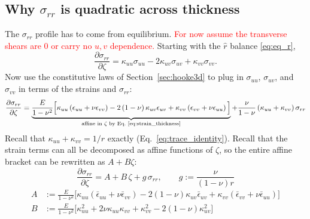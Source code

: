 \documentclass[11pt]{article}
\begin{document}
\subsection{Why \texorpdfstring{$\sigma_{rr}$}{sigma-rr} is quadratic across thickness}
\label{sec:srr_quadratic}
The $\sigma_{rr}$ profile has to come from equilibrium. 
\textcolor{red}{For now assume the transverse shears are 0 or carry no $u,v$ dependence.} Starting with the $\hat r$ balance \eqref{eq:eq_r},
\begin{equation}\label{eq:srr_step1}
    \frac{\partial \sigma_{rr}}{\partial \zeta}
      = \kappa_{uu}\sigma_{uu} - 2\kappa_{uv}\sigma_{uv}
        + \kappa_{vv}\sigma_{vv}.
\end{equation}
Now use the constitutive laws of Section~\ref{sec:hooke3d} to plug in $\sigma_{uu}$, $\sigma_{uv}$, and $\sigma_{vv}$ in terms of the strains and $\sigma_{rr}$:
\begin{equation}\label{eq:srr_step2}
    \frac{\partial \sigma_{rr}}{\partial \zeta}
    = \underbrace{\frac{E}{1-\nu^{2}}\Big[\kappa_{uu}
        \left(\epsilon_{uu}+\nu\epsilon_{vv}\right)
        - 2\left(1-\nu\right)\kappa_{uv}\epsilon_{uv}
        + \kappa_{vv}\left(\epsilon_{vv}+\nu\epsilon_{uu}\right)\Big]}
        _{\text{affine in }\zeta\text{ by Eq.~\eqref{eq:strain_thickness}}}
        + \frac{\nu}{1-\nu}
        \left(\kappa_{uu}+\kappa_{vv}\right)\sigma_{rr}
\end{equation}
Recall that $\kappa_{uu}+\kappa_{vv} = 1/r$ exactly
(Eq.~\ref{eq:trace_identity}). Recall that the strain terms can all be decomposed as affine functions of $\zeta$, so the entire affine bracket can be rewritten as $A + B\zeta$:
\begin{equation}\label{eq:srr_ode}
    \frac{\partial \sigma_{rr}}{\partial \zeta}
      = A + B\,\zeta + g\,\sigma_{rr},
    \qquad
    g := \frac{\nu}{\left(1-\nu\right)r}
\end{equation}
\begin{align}
    A &:= \frac{E}{1-\nu^{2}}\Big[\kappa_{uu}
        \left(\bar\epsilon_{uu}+\nu\bar\epsilon_{vv}\right)
        - 2\left(1-\nu\right)\kappa_{uv}\bar\epsilon_{uv}
        + \kappa_{vv}\left(\bar\epsilon_{vv}+\nu\bar\epsilon_{uu}\right)\Big]\\
    B &:= \frac{E}{1-\nu^{2}}\Big[\kappa_{uu}^2 + 2\nu\kappa_{uu}\kappa_{vv} + \kappa_{vv}^2
        - 2\left(1-\nu\right)\kappa_{uv}^2
        \Big]
\end{align}
\end{document}
